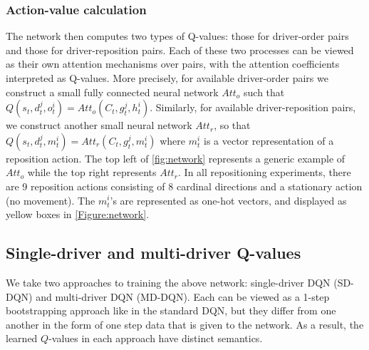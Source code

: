 \subsubsection{Action-value calculation}
The network then computes two types of Q-values: those for driver-order pairs and those for driver-reposition pairs. Each of these two processes can be viewed as their own attention mechanisms over pairs, with the attention coefficients interpreted as Q-values. More precisely, for available driver-order pairs we construct a small fully connected neural network $Att_o$ such that $Q(s_t, d_t^j, o_t^i) = Att_o(C_t, g_t^j, h_t^i)$. Similarly, for available driver-reposition pairs, we construct another small neural network $Att_r$, so that $Q(s_t, d_t^j, m_t^i) = Att_r(C_t, g_t^j, m_t^i)$ where $m_t^i$ is a vector representation of a reposition action. The top left of \cref{fig:network} represents a generic example of $Att_o$ while the top right represents $Att_r$. In all repositioning experiments, there are 9 reposition actions consisting of 8 cardinal directions and a stationary action (no movement). The $m_t^i$'s are represented as one-hot vectors, and displayed as yellow boxes in \cref{Figure:network}. 

\subsection{Single-driver and multi-driver Q-values}


We take two approaches to training the above network: single-driver DQN (SD-DQN) and multi-driver DQN (MD-DQN). Each can be viewed as a 1-step bootstrapping approach like in the standard DQN, but they differ from one another in the form of one step data that is given to the network. As a result, the learned $Q$-values in each approach have distinct semantics.

